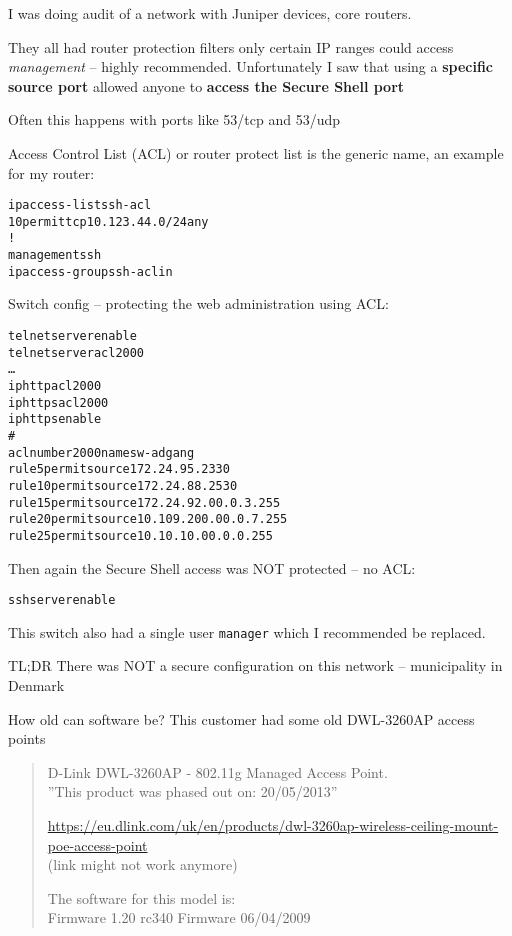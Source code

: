 \documentclass[Screen16to9,17pt]{foils}
\begin{document}
I was doing audit of a network with Juniper devices, core routers.

They all had router protection filters only certain IP ranges could access \emph{management} -- highly recommended. Unfortunately I saw that using a {\bf specific source port} allowed anyone to {\bf access the Secure Shell port}

\vskip 20mm
\begin{list2}
\item Often this happens with ports like 53/tcp and 53/udp
\end{list2}

Access Control List (ACL) or router protect list is the generic name, an example for my router:
\begin{alltt}\small
ip access-list ssh-acl
   10 permit tcp 10.123.44.0/24 any
!
management ssh
   ip access-group ssh-acl in
\end{alltt}






Switch config -- protecting the web administration using ACL:
\begin{alltt}\scriptsize
telnet server enable
telnet server acl 2000
…
ip http acl 2000
ip https acl 2000
ip https enable
#
acl number 2000 name sw-adgang
rule 5 permit source 172.24.95.233 0
rule 10 permit source 172.24.88.253 0
rule 15 permit source 172.24.92.0 0.0.3.255
rule 20 permit source 10.109.200.0 0.0.7.255
rule 25 permit source 10.10.10.0 0.0.0.255
\end{alltt}

Then again the Secure Shell access was NOT protected -- no ACL:
\begin{alltt}\scriptsize
ssh server enable
\end{alltt}

This switch also had a single user \verb+manager+ which I recommended be replaced.

TL;DR There was NOT a secure configuration on this network -- municipality in Denmark



How old can software be? This customer had some old DWL-3260AP access points

\begin{quote}
D-Link DWL-3260AP - 802.11g Managed Access Point.\\
”This product was phased out on: 20/05/2013”

\url{https://eu.dlink.com/uk/en/products/dwl-3260ap-wireless-ceiling-mount-poe-access-point}\\
 (link might not work anymore)

The software for this model is:\\
Firmware 1.20 rc340 Firmware 06/04/2009
\end{quote}
\end{document}
